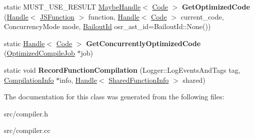 \begin{DoxyCompactItemize}
\item 
\hypertarget{classv8_1_1internal_1_1_compiler_a78f5cd23cabe184d97cd4091171b77b4}{}static M\+U\+S\+T\+\_\+\+U\+S\+E\+\_\+\+R\+E\+S\+U\+L\+T \hyperlink{classv8_1_1internal_1_1_maybe_handle}{Maybe\+Handle}$<$ \hyperlink{classv8_1_1internal_1_1_code}{Code} $>$ {\bfseries Get\+Optimized\+Code} (\hyperlink{classv8_1_1internal_1_1_handle}{Handle}$<$ \hyperlink{classv8_1_1internal_1_1_j_s_function}{J\+S\+Function} $>$ function, \hyperlink{classv8_1_1internal_1_1_handle}{Handle}$<$ \hyperlink{classv8_1_1internal_1_1_code}{Code} $>$ current\+\_\+code, Concurrency\+Mode mode, \hyperlink{classv8_1_1internal_1_1_bailout_id}{Bailout\+Id} osr\+\_\+ast\+\_\+id=Bailout\+Id\+::\+None())\label{classv8_1_1internal_1_1_compiler_a78f5cd23cabe184d97cd4091171b77b4}

\item 
\hypertarget{classv8_1_1internal_1_1_compiler_a972a81378f6f8ff345c13421e7b21b4f}{}static \hyperlink{classv8_1_1internal_1_1_handle}{Handle}$<$ \hyperlink{classv8_1_1internal_1_1_code}{Code} $>$ {\bfseries Get\+Concurrently\+Optimized\+Code} (\hyperlink{classv8_1_1internal_1_1_optimized_compile_job}{Optimized\+Compile\+Job} $\ast$job)\label{classv8_1_1internal_1_1_compiler_a972a81378f6f8ff345c13421e7b21b4f}

\item 
\hypertarget{classv8_1_1internal_1_1_compiler_ae52e0acb7a1d67ff493f627f3f1aaea7}{}static void {\bfseries Record\+Function\+Compilation} (Logger\+::\+Log\+Events\+And\+Tags tag, \hyperlink{classv8_1_1internal_1_1_compilation_info}{Compilation\+Info} $\ast$info, \hyperlink{classv8_1_1internal_1_1_handle}{Handle}$<$ \hyperlink{classv8_1_1internal_1_1_shared_function_info}{Shared\+Function\+Info} $>$ shared)\label{classv8_1_1internal_1_1_compiler_ae52e0acb7a1d67ff493f627f3f1aaea7}

\end{DoxyCompactItemize}


The documentation for this class was generated from the following files\+:\begin{DoxyCompactItemize}
\item 
src/compiler.\+h\item 
src/compiler.\+cc\end{DoxyCompactItemize}
